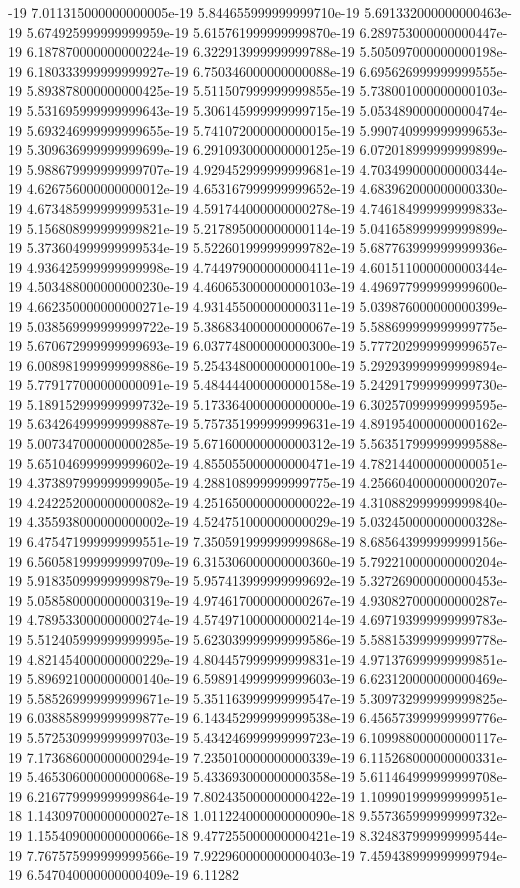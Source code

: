-19	7.011315000000000005e-19	5.844655999999999710e-19	5.691332000000000463e-19	5.674925999999999959e-19	5.615761999999999870e-19	6.289753000000000447e-19	6.187870000000000224e-19	6.322913999999999788e-19	5.505097000000000198e-19	6.180333999999999927e-19	6.750346000000000088e-19	6.695626999999999555e-19	5.893878000000000425e-19	5.511507999999999855e-19	5.738001000000000103e-19	5.531695999999999643e-19	5.306145999999999715e-19	5.053489000000000474e-19	5.693246999999999655e-19	5.741072000000000015e-19	5.990740999999999653e-19	5.309636999999999699e-19	6.291093000000000125e-19	6.072018999999999899e-19	5.988679999999999707e-19	4.929452999999999681e-19	4.703499000000000344e-19	4.626756000000000012e-19	4.653167999999999652e-19	4.683962000000000330e-19	4.673485999999999531e-19	4.591744000000000278e-19	4.746184999999999833e-19	5.156808999999999821e-19	5.217895000000000114e-19	5.041658999999999899e-19	5.373604999999999534e-19	5.522601999999999782e-19	5.687763999999999936e-19	4.936425999999999998e-19	4.744979000000000411e-19	4.601511000000000344e-19	4.503488000000000230e-19	4.460653000000000103e-19	4.496977999999999600e-19	4.662350000000000271e-19	4.931455000000000311e-19	5.039876000000000399e-19	5.038569999999999722e-19	5.386834000000000067e-19	5.588699999999999775e-19	5.670672999999999693e-19	6.037748000000000300e-19	5.777202999999999657e-19	6.008981999999999886e-19	5.254348000000000100e-19	5.292939999999999894e-19	5.779177000000000091e-19	5.484444000000000158e-19	5.242917999999999730e-19	5.189152999999999732e-19	5.173364000000000000e-19	6.302570999999999595e-19	5.634264999999999887e-19	5.757351999999999631e-19	4.891954000000000162e-19	5.007347000000000285e-19	5.671600000000000312e-19	5.563517999999999588e-19	5.651046999999999602e-19	4.855055000000000471e-19	4.782144000000000051e-19	4.373897999999999905e-19	4.288108999999999775e-19	4.256604000000000207e-19	4.242252000000000082e-19	4.251650000000000022e-19	4.310882999999999840e-19	4.355938000000000002e-19	4.524751000000000029e-19	5.032450000000000328e-19	6.475471999999999551e-19	7.350591999999999868e-19	8.685643999999999156e-19	6.560581999999999709e-19	6.315306000000000360e-19	5.792210000000000204e-19	5.918350999999999879e-19	5.957413999999999692e-19	5.327269000000000453e-19	5.058580000000000319e-19	4.974617000000000267e-19	4.930827000000000287e-19	4.789533000000000274e-19	4.574971000000000214e-19	4.697193999999999783e-19	5.512405999999999995e-19	5.623039999999999586e-19	5.588153999999999778e-19	4.821454000000000229e-19	4.804457999999999831e-19	4.971376999999999851e-19	5.896921000000000140e-19	6.598914999999999603e-19	6.623120000000000469e-19	5.585269999999999671e-19	5.351163999999999547e-19	5.309732999999999825e-19	6.038858999999999877e-19	6.143452999999999538e-19	6.456573999999999776e-19	5.572530999999999703e-19	5.434246999999999723e-19	6.109988000000000117e-19	7.173686000000000294e-19	7.235010000000000339e-19	6.115268000000000331e-19	5.465306000000000068e-19	5.433693000000000358e-19	5.611464999999999708e-19	6.216779999999999864e-19	7.802435000000000422e-19	1.109901999999999951e-18	1.143097000000000027e-18	1.011224000000000090e-18	9.557365999999999732e-19	1.155409000000000066e-18	9.477255000000000421e-19	8.324837999999999544e-19	7.767575999999999566e-19	7.922960000000000403e-19	7.459438999999999794e-19	6.547040000000000409e-19	6.11282